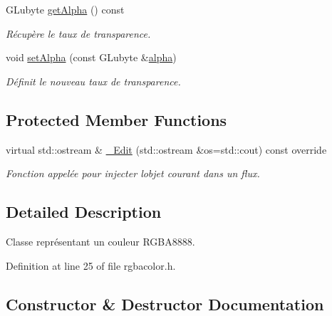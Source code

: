 \begin{DoxyCompactItemize}
G\+Lubyte \hyperlink{classns_graphics_1_1_r_g_b_acolor_a76299c507a113e326c01fe4b0bca2b1e}{get\+Alpha} () const
\begin{DoxyCompactList}\small\item\em Récupère le taux de transparence. \end{DoxyCompactList}\item 
void \hyperlink{classns_graphics_1_1_r_g_b_acolor_aa478d3c5b8b56f590a12461fe2ab4bbf}{set\+Alpha} (const G\+Lubyte \&\hyperlink{get_pseudo_8cpp_a91dd017bd061f2dac37ce9b6e37cb360}{alpha})
\begin{DoxyCompactList}\small\item\em Définit le nouveau taux de transparence. \end{DoxyCompactList}\end{DoxyCompactItemize}
\subsection*{Protected Member Functions}
\begin{DoxyCompactItemize}
\item 
virtual std\+::ostream \& \hyperlink{classns_graphics_1_1_r_g_b_acolor_add0c76f970c8617971ef8c5512335e88}{\+\_\+\+Edit} (std\+::ostream \&os=std\+::cout) const override
\begin{DoxyCompactList}\small\item\em Fonction appelée pour injecter l\textquotesingle{}objet courant dans un flux. \end{DoxyCompactList}\end{DoxyCompactItemize}


\subsection{Detailed Description}
Classe représentant un couleur R\+G\+B\+A8888. 

Definition at line 25 of file rgbacolor.\+h.



\subsection{Constructor \& Destructor Documentation}
\mbox{\label{classns_graphics_1_1_r_g_b_acolor_a6f91976b2d83414329608564615f27b1}} 
